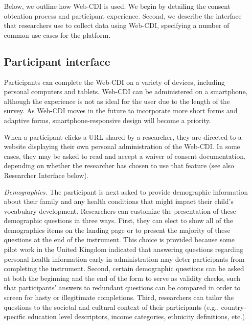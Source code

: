 \documentclass[
  english,
  ,man,floatsintext]{apa6}
\begin{document}
Below, we outline how Web-CDI is used. We begin by detailing the consent obtention process and participant experience. Second, we describe the interface that researchers use to collect data using Web-CDI, specifying a number of common use cases for the platform.

\hypertarget{participant-interface}{%
\subsection{Participant interface}\label{participant-interface}}

Participants can complete the Web-CDI on a variety of devices, including personal computers and tablets. Web-CDI can be administered on a smartphone, although the experience is not as ideal for the user due to the length of the survey. As Web-CDI moves in the future to incorporate more short forms and adaptive forms, smartphone-responsive design will become a priority.

When a participant clicks a URL shared by a researcher, they are directed to a website displaying their own personal administration of the Web-CDI. In some cases, they may be asked to read and accept a waiver of consent documentation, depending on whether the researcher has chosen to use that feature (see also Researcher Interface below).

\emph{Demographics.} The participant is next asked to provide demographic information about their family and any health conditions that might impact their child's vocabulary development. Researchers can customize the presentation of these demographic questions in three ways. First, they can elect to show all of the demographics items on the landing page or to present the majority of these questions at the end of the instrument. This choice is provided because some pilot work in the United Kingdom indicated that answering questions regarding personal health information early in administration may deter participants from completing the instrument. Second, certain demographic questions can be asked at both the beginning and the end of the form to serve as validity checks, such that participants' answers to redundant questions can be compared in order to screen for hasty or illegitimate completions. Third, researchers can tailor the questions to the societal and cultural context of their participants (e.g., country-specific education level descriptors, income categories, ethnicity definitions, etc.).
\end{document}
